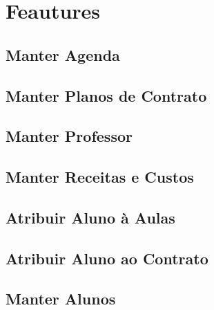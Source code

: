 \section[Features]{Feautures}
\subsection[Manter Agenda]{Manter Agenda}
\subsection[Manter Planos de Contrato]{Manter Planos de Contrato}
\subsection[Manter Professor]{Manter Professor}
\subsection[Manter Receitas e Custos]{Manter Receitas e Custos}
\subsection[Atribuir Aluno à Aulas]{Atribuir Aluno à Aulas}
\subsection[Atribuir Aluno ao Contrato]{Atribuir Aluno ao Contrato}
\subsection[Manter Alunos]{Manter Alunos}
